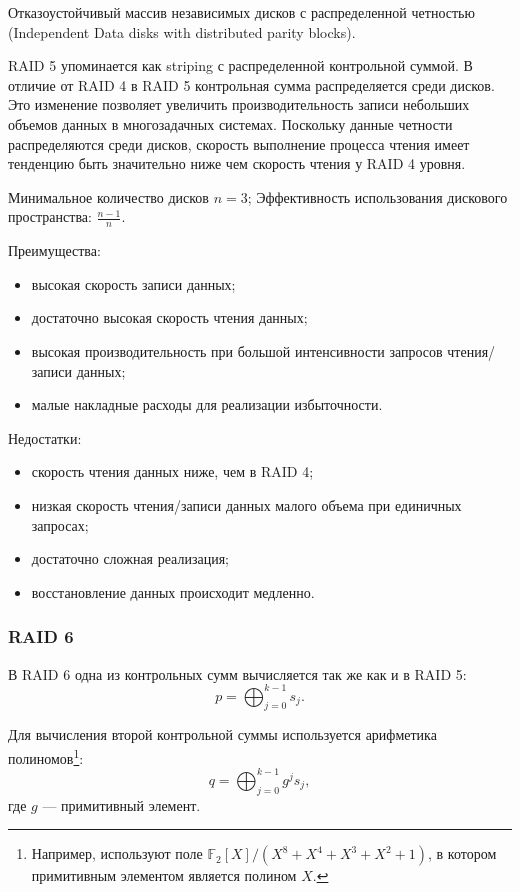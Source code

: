 Отказоустойчивый массив независимых дисков с распределенной четностью (Independent Data disks with distributed parity blocks).

RAID 5 упоминается как striping с распределенной контрольной суммой. В отличие от RAID 4 в RAID 5 контрольная сумма распределяется среди дисков. Это изменение позволяет увеличить производительность записи небольших объемов данных в многозадачных системах. Поскольку данные четности распределяются среди дисков, скорость выполнение процесса чтения имеет тенденцию быть значительно ниже чем скорость чтения у RAID 4 уровня.

Минимальное количество дисков $n=3$; Эффективность использования дискового пространства: $\frac{n-1}{n}$.

Преимущества:
\begin{itemize}
    \item высокая скорость записи данных;
    \item достаточно высокая скорость чтения данных;
    \item высокая производительность при большой интенсивности запросов чтения/записи данных;
    \item малые накладные расходы для реализации избыточности. 
\end{itemize}

Недостатки:
\begin{itemize}
    \item скорость чтения данных ниже, чем в RAID 4;
    \item низкая скорость чтения/записи данных малого объема при единичных запросах;
    \item достаточно сложная реализация;
    \item восстановление данных происходит медленно.
\end{itemize}


\begin{frame}
    \frametitle{RAID 6}
    
    В RAID 6 одна из контрольных сумм вычисляется так же как и в RAID 5:
    \[ p=\bigoplus_{j=0}^{k-1}s_{j}. \]
    
    Для вычисления второй контрольной суммы используется арифметика полиномов\footnote{Например, используют поле $\mathbb{F}_2[X]/(X^8+X^4+X^3+X^2+1)$, в котором \alert{примитивным} элементом является полином $X$.}:
    \[ q=\bigoplus_{j=0}^{k-1}g^js_{j}, \]
    где $g$ --- примитивный элемент.
\end{frame}


